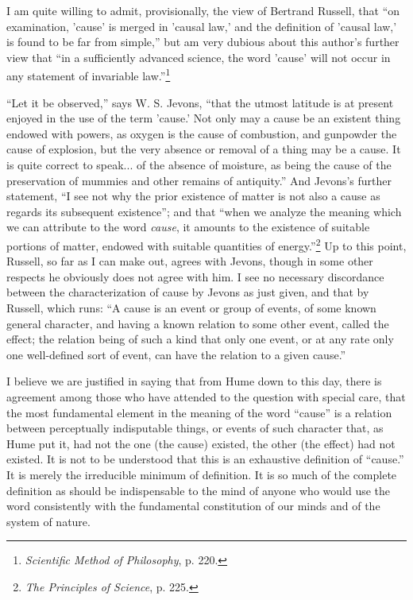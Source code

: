 \documentclass[a4paper, 11pt, oneside, polutonikogreek, english, landscape]{article}
\begin{document}
I am quite willing to admit, provisionally, the view of Bertrand Russell, that ``on examination, 'cause' is merged in 'causal law,' and the definition of 'causal law,' is found to be far from simple,'' but am very dubious about this author's further view that ``in a sufficiently advanced science, the word 'cause' will not occur in any statement of invariable law.''\footnote{\emph{Scientific Method of Philosophy}, p. 220.}

``Let it be observed,'' says W. S. Jevons, ``that the utmost latitude is at present enjoyed in the use of the term 'cause.' Not only may a cause be an existent thing endowed with powers, as oxygen is the cause of combustion, and gunpowder the cause of explosion, but the very absence or removal of a thing may be a cause. It is quite correct to speak... of the absence of moisture, as being the cause of the preservation of mummies and other remains of antiquity.'' And Jevons's further statement, ``I see not why the prior existence of matter is not also a cause as regards its subsequent existence''; and that ``when we analyze the meaning which we can attribute to the word \emph{cause}, it amounts to the existence of suitable portions of matter, endowed with suitable quantities of energy.''\footnote{\emph{The Principles of Science}, p. 225.} Up to this point, Russell, so far as I can make out, agrees with Jevons, though in some other respects he obviously does not agree with him. I see no necessary discordance between the characterization of cause by Jevons as just given, and that by Russell, which runs: ``A cause is an event or group of events, of some known general character, and having a known relation to some other event, called the effect; the relation being of such a kind that only one event, or at any rate only one well-defined sort of event, can have the relation to a given cause.''

I believe we are justified in saying that from Hume down to this day, there is agreement among those who have attended to the question with special care, that the most fundamental element in the meaning of the word ``cause'' is a relation between perceptually indisputable things, or events of such character that, as Hume put it, had not the one (the cause) existed, the other (the effect) had not existed. It is not to be understood that this is an exhaustive definition of ``cause.'' It is merely the irreducible minimum of definition. It is so much of the complete definition as should be indispensable to the mind of anyone who would use the word consistently with the fundamental constitution of our minds and of the system of nature.
\end{document}
